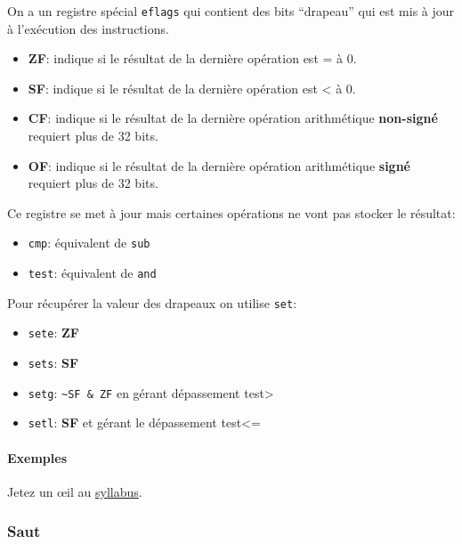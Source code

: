 On a un registre spécial \texttt{eflags} qui contient des bits
``drapeau'' qui est mis à jour à l'exécution des instructions.

\begin{itemize}
\tightlist
\item
  \textbf{ZF}: indique si le résultat de la dernière opération est = à
  0.
\item
  \textbf{SF}: indique si le résultat de la dernière opération est
  \textless{} à 0.
\item
  \textbf{CF}: indique si le résultat de la dernière opération
  arithmétique \textbf{non-signé} requiert plus de 32 bits.
\item
  \textbf{OF}: indique si le résultat de la dernière opération
  arithmétique \textbf{signé} requiert plus de 32 bits.
\end{itemize}

Ce registre se met à jour mais certaines opérations ne vont pas stocker
le résultat:

\begin{itemize}
\tightlist
\item
  \texttt{cmp}: équivalent de \texttt{sub}
\item
  \texttt{test}: équivalent de \texttt{and}
\end{itemize}

Pour récupérer la valeur des drapeaux on utilise \texttt{set}:

\begin{itemize}
\tightlist
\item
  \texttt{sete}: \textbf{ZF}
\item
  \texttt{sets}: \textbf{SF}
\item
  \texttt{setg}: \texttt{\textasciitilde{}SF\ \&\ ZF} en gérant
  dépassement test\textgreater{}
\item
  \texttt{setl}: \textbf{SF} et gérant le dépassement test\textless=
\end{itemize}

\paragraph{Exemples}\label{exemples}

Jetez un œil au
\href{https://sites.uclouvain.be/SystInfo/notes/Theorie/Assembleur/memory.html}{syllabus}.

\subsubsection{Saut}\label{saut}

